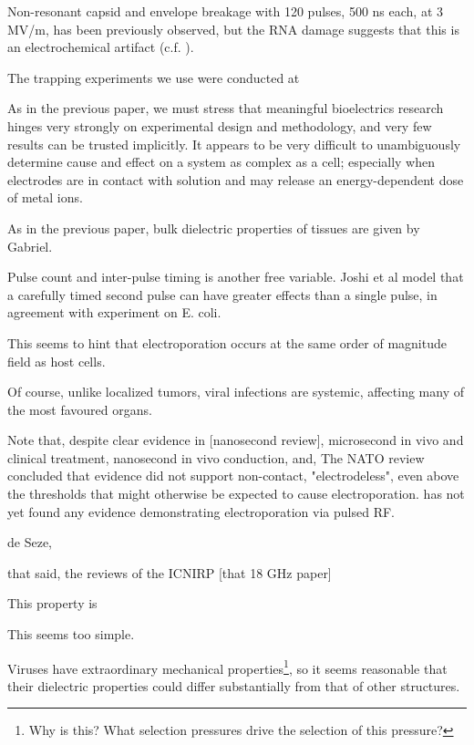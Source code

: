 \documentclass[fleqn,10pt]{paper}
\begin{document}
Non-resonant capsid and envelope breakage with 120 pulses, 500 ns each, at 3 MV/m, has been previously observed\cite{Inactivation1990}, but the RNA damage suggests that this is an electrochemical artifact \cite{Formation1996} (c.f. \cite{Microwave1987}). 

The trapping experiments we use were conducted at 

As in the previous paper, we must stress that meaningful bioelectrics research hinges very strongly on experimental design and methodology, and very few results can be trusted implicitly. It appears to be very difficult to unambiguously determine cause and effect on a system as complex as a cell; especially when electrodes are in contact with solution and may release an energy-dependent dose of metal ions.




As in the previous paper, bulk dielectric properties of tissues are given by Gabriel. 


Pulse count and inter-pulse timing is another free variable. Joshi et al \cite{Selfconsistent2001} model that a carefully timed second pulse can have greater effects than a single pulse, in agreement with experiment on E. coli.

This seems to hint that electroporation occurs at the same order of magnitude field as host cells.

Of course, unlike localized tumors, viral infections are systemic, affecting many of the most favoured organs. 



Note that, despite clear evidence in [nanosecond review], microsecond in vivo and clinical treatment, nanosecond in vivo conduction, and, The NATO review concluded that evidence did not support non-contact, "electrodeless", even above the thresholds that might otherwise be expected to cause electroporation. has not yet found any evidence demonstrating electroporation via pulsed RF. 

de Seze, 

that said, the reviews of the ICNIRP [that 18 GHz  paper]

This property is 
\cite{Nanosecond2006b} 



This seems too simple.

Viruses have extraordinary mechanical properties\footnote{Why is this? What selection pressures drive the selection of this pressure?}, so it seems reasonable that their dielectric properties could differ substantially from that of other structures. 
\end{document}
